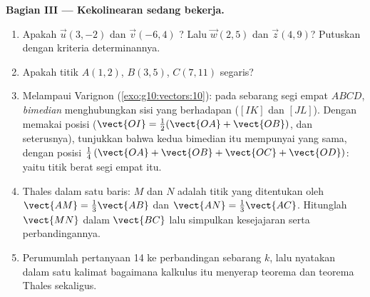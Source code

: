 \begin{problem}
\medskip
\noindent\textbf{Bagian III --- Kekolinearan sedang bekerja.}
\begin{enumerate}[resume]
  \item Apakah $\vec u(3, -2)$ dan $\vec v(-6, 4)$ ? Lalu
        $\vec w(2, 5)$ dan $\vec z(4, 9)$? Putuskan dengan
        kriteria determinannya.
  \item Apakah titik $A(1, 2)$, $B(3, 5)$, $C(7, 11)$
        segaris?
  \item Melampaui Varignon (\cref{exo:g10:vectors:10}): pada sebarang
        segi empat $ABCD$, \emph{bimedian} menghubungkan
         sisi yang berhadapan ($[IK]$ dan $[JL]$). Dengan
        memakai  posisi ($\vect{OI} = \frac12(\vect{OA} +
        \vect{OB})$, dan seterusnya), tunjukkan bahwa kedua bimedian itu
        mempunyai  yang sama, dengan  posisi
        $\frac14\left(\vect{OA} + \vect{OB} + \vect{OC} +
        \vect{OD}\right)$: yaitu titik berat segi empat itu.
  \item Thales dalam satu baris: $M$ dan $N$ adalah titik yang ditentukan
        oleh $\vect{AM} = \frac13\vect{AB}$ dan
        $\vect{AN} = \frac13\vect{AC}$. Hitunglah
        $\vect{MN}$ dalam $\vect{BC}$ lalu simpulkan
        kesejajaran serta perbandingannya.
  \item Perumumlah pertanyaan 14 ke perbandingan sebarang $k$, lalu
        nyatakan dalam satu kalimat bagaimana kalkulus  itu
        menyerap teorema  dan
        teorema Thales sekaligus.
\end{enumerate}


\end{problem}
